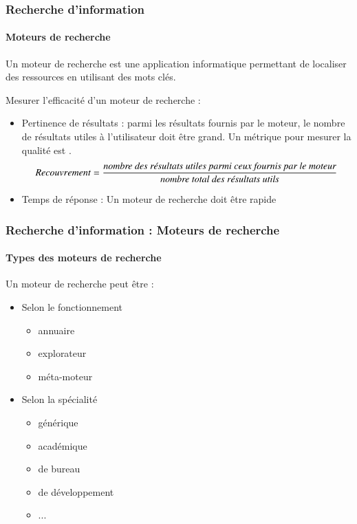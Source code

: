 \documentclass[xcolor=table]{beamer}
\begin{document}
\begin{frame}
\frametitle{Recherche d'information}
\framesubtitle{Moteurs de recherche}

\begin{definition}
	Un moteur de recherche est une application informatique permettant de localiser des ressources en utilisant des mots clés.
\end{definition}

Mesurer l'efficacité d'un moteur de recherche :
\begin{itemize}
	\item Pertinence de résultats : parmi les résultats fournis par le moteur, le nombre de résultats utiles à l'utilisateur doit être grand. Un métrique pour mesurer la qualité est .
	{\scriptsize \[ Recouvrement = \frac{\text{\itshape nombre des résultats utiles parmi ceux fournis par le moteur}}{\text{\itshape nombre total des résultats utils}} \]}
	\item Temps de réponse : Un moteur de recherche doit être rapide
\end{itemize}

\end{frame}

\begin{frame}
\frametitle{Recherche d'information : Moteurs de recherche}
\framesubtitle{Types des moteurs de recherche}

Un moteur de recherche peut être :
\begin{itemize}
	\item Selon le fonctionnement
	\begin{itemize}
		\item annuaire
		\item explorateur
		\item méta-moteur
	\end{itemize}

	\item Selon la spécialité
	\begin{itemize}
		\item générique
		\item académique
		\item de bureau 
		\item de développement
		\item ...
	\end{itemize}
\end{itemize} 

\end{frame}
\end{document}
